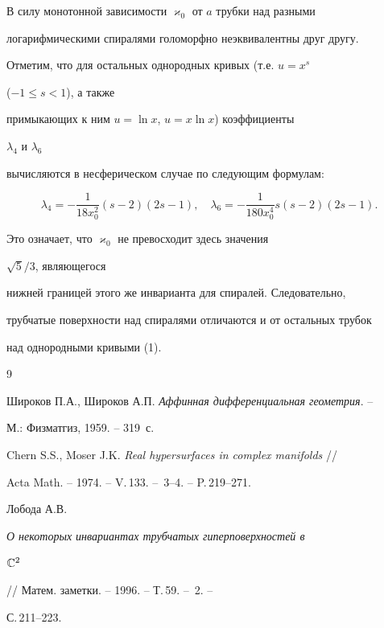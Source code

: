 В силу монотонной зависимости $\varkappa_0$ от $a$ трубки над разными 


логарифмическими спиралями голоморфно неэквивалентны друг другу. 


Отметим, что для остальных однородных кривых (т.е. $u=x^s$ 


($-1\le s<1$), а также 


примыкающих к ним $u=\ln x$, $u=x\ln x$) коэффициенты 


$\lambda_4$ и $\lambda_6$ 


вычисляются в несферическом случае по следующим формулам: 


$$ 


\lambda_4=-\frac{1}{18x^2_0}(s-2)(2s-1),\quad 


\lambda_6=-\frac{1}{180x^4_0}s(s-2)(2s-1). 


$$ 


Это означает, что $\varkappa_0$ не превосходит здесь значения 


$\sqrt 5/3$, являющегося 


нижней границей этого же инварианта для спиралей. Следовательно, 


трубчатые поверхности над спиралями отличаются и от остальных трубок 


над однородными кривыми (1). 


 


 


\begin{thebibliography}{9}  


 




Широков П.А., Широков А.П. {\em Аффинная дифференциальная геометрия}. -- 


М.: Физматгиз, 1959. -- 319~с. 




Chern S.S., Moser J.K. {\em Real hypersurfaces in complex manifolds} // 


Acta Math. -- 1974. -- V.\,133. -- \No\,3--4. -- P.\,219--271. 




Лобода А.В. {\em О некоторых инвариантах трубчатых гиперповерхностей в 


$\Bbb C^2$} // Матем. заметки. -- 1996. -- Т.\,59. -- \No\,2. -- 


С.\,211--223. 


 


\end{thebibliography}  


  


\vskip 2cm  


  






 


  


